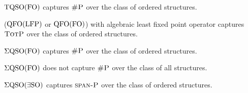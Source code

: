 \begin{theorem}
	${\rm TQSO}({\rm FO})$ captures $\text{\sc \#P}$ over the class of ordered structures.
\end{theorem}

\begin{theorem}
	(${\rm QFO}({\rm LFP})$ or ${\rm QFO}({\rm FO})$) with algebraic least fixed point operator captures $\text{\sc TotP}$ over the class of ordered structures.
\end{theorem}
	

\begin{theorem}
$\Sigma{\rm QSO}({\rm FO})$ captures $\text{\sc \#P}$ over the class of ordered structures.
\end{theorem}

\begin{proposition}
$\Sigma{\rm QSO}({\rm FO})$ does not capture $\text{\sc \#P}$ over the class of all structures.
\end{proposition}



\begin{theorem}
$\Sigma{\rm QSO}(\exists{\rm SO})$ captures $\text{\sc span-P}$ over the class of ordered structures.
\end{theorem}
